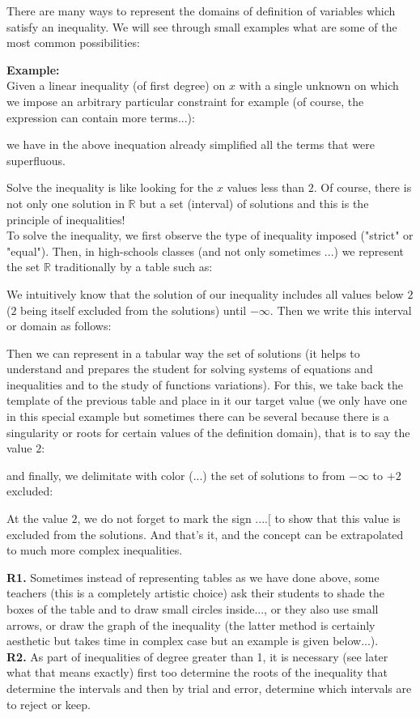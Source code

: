 	There are many ways to represent the domains of definition of variables which satisfy an inequality. We will see through small examples what are some of the  most common possibilities:
	\begin{tcolorbox}[colframe=black,colback=white,sharp corners]
\textbf{{\Large {}}Example:}\\
	Given a linear inequality (of first degree) on $x$ with a single unknown on which we impose an arbitrary particular constraint for example (of course, the expression can contain more terms...):
	
	we have in the above inequation already simplified all the terms that were superfluous.
	
	Solve the inequality is like looking for the $x$ values less than $2$. Of course, there is not only one solution in $\mathbb{R}$ but a set (interval) of solutions and this is the principle of inequalities!\\
	
	To solve the inequality, we first observe the type of inequality imposed ("strict" or "equal"). Then, in high-schools classes (and not only sometimes ...) we represent the set $\mathbb{R}$ traditionally by a table such as:
	
	We intuitively know that the solution of our inequality includes all values below $2$ ($2$ being itself excluded from the solutions) until $-\infty$. Then we write this interval or domain as follows:
	
	Then we can represent in a tabular way the set of solutions (it helps to understand and prepares the student for solving systems of equations and inequalities and to the study of functions variations). For this, we take back the template of the previous table and place in it our target value (we only have one in this special example but sometimes there can be several because there is a singularity or roots for certain values of the definition domain), that is to say the value $2$:
	
	and finally, we delimitate with color (...) the set of solutions to from $-\infty$ to $+2$ excluded:
	
	At the value $2$, we do not forget to mark the sign $....[$ to show that this value is excluded from the solutions. And that's it, and the concept can be extrapolated to much more complex inequalities.
	\end{tcolorbox}
	\begin{tcolorbox}[title=Remark,colframe=black,arc=10pt]
	\textbf{R1.} Sometimes instead of representing tables as we have done above, some teachers (this is a completely artistic choice) ask their students to shade the boxes of the table and to draw small circles inside..., or they also use small arrows, or draw the graph of the inequality (the latter method is certainly aesthetic but takes time in complex case but an example is given below...).\\
	
	\textbf{R2.} As part of inequalities of degree greater than 1, it is necessary (see later what that means exactly) first too determine the roots of the inequality that determine the intervals and then by trial and error, determine which intervals are to reject or keep.
	\end{tcolorbox}
